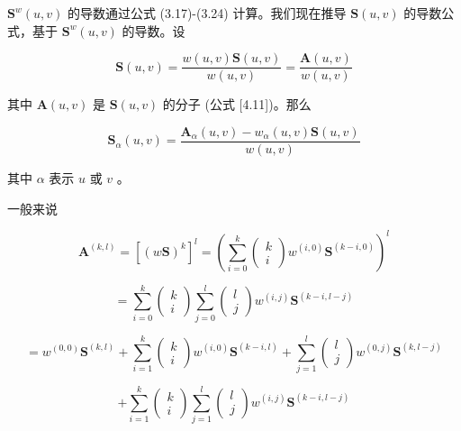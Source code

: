 \documentclass[../main.tex]{subfiles}
\begin{document}
\({\mathbf{S}}^{w}\left( {u,v}\right)\) 的导数通过公式 (3.17)-(3.24) 计算。我们现在推导 \(\mathbf{S}\left( {u,v}\right)\) 的导数公式，基于 \({\mathbf{S}}^{w}\left( {u,v}\right)\) 的导数。设

\[
\mathbf{S}\left( {u,v}\right)  = \frac{w\left( {u,v}\right) \mathbf{S}\left( {u,v}\right) }{w\left( {u,v}\right) } = \frac{\mathbf{A}\left( {u,v}\right) }{w\left( {u,v}\right) }
\]

其中 \(\mathbf{A}\left( {u,v}\right)\) 是 \(\mathbf{S}\left( {u,v}\right)\) 的分子 (公式 [4.11])。那么

\[
{\mathbf{S}}_{\alpha }\left( {u,v}\right)  = \frac{{\mathbf{A}}_{\alpha }\left( {u,v}\right)  - {w}_{\alpha }\left( {u,v}\right) \mathbf{S}\left( {u,v}\right) }{w\left( {u,v}\right) } \tag{4.19}
\]

其中 \(\alpha\) 表示 \(u\) 或 \(v\) 。

一般来说

\[
{\mathbf{A}}^{\left( k,l\right) } = {\left\lbrack  {\left( w\mathbf{S}\right) }^{k}\right\rbrack  }^{l} = {\left( \mathop{\sum }\limits_{{i = 0}}^{k}\left( \begin{matrix} k \\  i \end{matrix}\right) {w}^{\left( i,0\right) }{\mathbf{S}}^{\left( k - i,0\right) }\right) }^{l}
\]

\[
= \mathop{\sum }\limits_{{i = 0}}^{k}\left( \begin{array}{l} k \\  i \end{array}\right) \mathop{\sum }\limits_{{j = 0}}^{l}\left( \begin{array}{l} l \\  j \end{array}\right) {w}^{\left( i,j\right) }{\mathbf{S}}^{\left( k - i,l - j\right) }
\]

\[
= {w}^{\left( 0,0\right) }{\mathbf{S}}^{\left( k,l\right) } + \mathop{\sum }\limits_{{i = 1}}^{k}\left( \begin{matrix} k \\  i \end{matrix}\right) {w}^{\left( i,0\right) }{\mathbf{S}}^{\left( k - i,l\right) } + \mathop{\sum }\limits_{{j = 1}}^{l}\left( \begin{matrix} l \\  j \end{matrix}\right) {w}^{\left( 0,j\right) }{\mathbf{S}}^{\left( k,l - j\right) }
\]

\[
+ \mathop{\sum }\limits_{{i = 1}}^{k}\left( \begin{matrix} k \\  i \end{matrix}\right) \mathop{\sum }\limits_{{j = 1}}^{l}\left( \begin{array}{l} l \\  j \end{array}\right) {w}^{\left( i,j\right) }{\mathbf{S}}^{\left( k - i,l - j\right) }
\]
\end{document}

